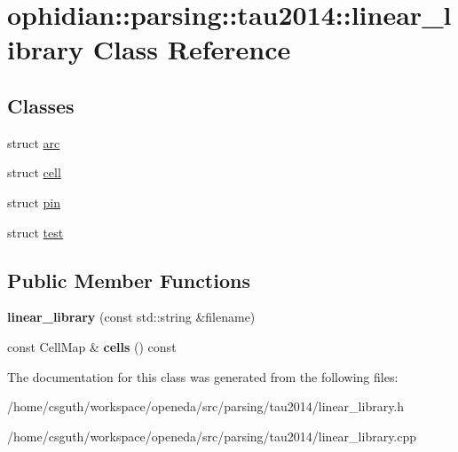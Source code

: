 \hypertarget{classophidian_1_1parsing_1_1tau2014_1_1linear__library}{\section{ophidian\-:\-:parsing\-:\-:tau2014\-:\-:linear\-\_\-library Class Reference}
\label{classophidian_1_1parsing_1_1tau2014_1_1linear__library}
}
\subsection*{Classes}
\begin{DoxyCompactItemize}
\item 
struct \hyperlink{structophidian_1_1parsing_1_1tau2014_1_1linear__library_1_1arc}{arc}
\item 
struct \hyperlink{structophidian_1_1parsing_1_1tau2014_1_1linear__library_1_1cell}{cell}
\item 
struct \hyperlink{structophidian_1_1parsing_1_1tau2014_1_1linear__library_1_1pin}{pin}
\item 
struct \hyperlink{structophidian_1_1parsing_1_1tau2014_1_1linear__library_1_1test}{test}
\end{DoxyCompactItemize}
\subsection*{Public Member Functions}
\begin{DoxyCompactItemize}
\item 
\hypertarget{classophidian_1_1parsing_1_1tau2014_1_1linear__library_aa7b78e78f4d1f8f70a099e236e183a5f}{{\bfseries linear\-\_\-library} (const std\-::string \&filename)}\label{classophidian_1_1parsing_1_1tau2014_1_1linear__library_aa7b78e78f4d1f8f70a099e236e183a5f}

\item 
\hypertarget{classophidian_1_1parsing_1_1tau2014_1_1linear__library_a39fda74da349098c41a57a9ec54fb5ec}{const Cell\-Map \& {\bfseries cells} () const }\label{classophidian_1_1parsing_1_1tau2014_1_1linear__library_a39fda74da349098c41a57a9ec54fb5ec}

\end{DoxyCompactItemize}


The documentation for this class was generated from the following files\-:\begin{DoxyCompactItemize}
\item 
/home/csguth/workspace/openeda/src/parsing/tau2014/linear\-\_\-library.\-h\item 
/home/csguth/workspace/openeda/src/parsing/tau2014/linear\-\_\-library.\-cpp\end{DoxyCompactItemize}
